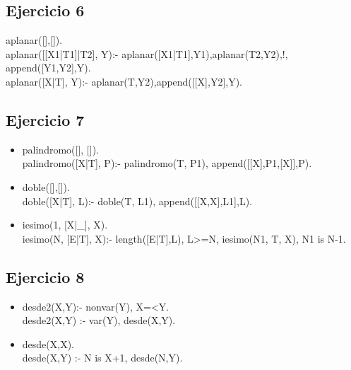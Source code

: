 \documentclass[10pt,a4paper]{article}
\begin{document}
\subsection{Ejercicio 6}
aplanar([],[]). \\
aplanar([[X1|T1]|T2], Y):- aplanar([X1|T1],Y1),aplanar(T2,Y2),!, append([Y1,Y2],Y). \\
aplanar([X|T], Y):- aplanar(T,Y2),append([[X],Y2],Y).

\subsection{Ejercicio 7}
\begin{itemize}
\item 
palindromo([], []). \\
palindromo([X|T], P):- palindromo(T, P1), append([[X],P1,[X]],P).
\item 
doble([],[]). \\
doble([X|T], L):- doble(T, L1), append([[X,X],L1],L).
\item 
iesimo(1, [X|_], X). \\
iesimo(N, [E|T], X):- length([E|T],L), L>=N, iesimo(N1, T, X), N1 is N-1.
\end{itemize}

\subsection{Ejercicio 8}
\begin{itemize}
\item desde2(X,Y):- nonvar(Y), X=<Y. \\
desde2(X,Y) :- var(Y), desde(X,Y).
\item desde(X,X). \\
desde(X,Y) :- N is X+1, desde(N,Y).
\end{itemize}
\end{document}
